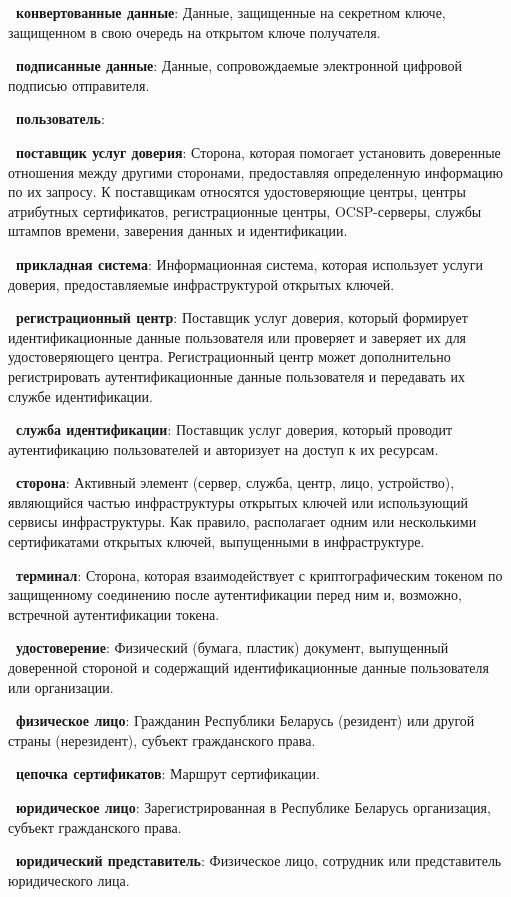 {\bf \thedefctr~конвертованные данные}:
Данные, защищенные на секретном ключе, 
защищенном в свою очередь на открытом ключе получателя. 

{\bf \thedefctr~подписанные данные}:
Данные, сопровождаемые электронной цифровой подписью отправителя. 

{\bf\thedefctr~пользователь}: 

{\bf\thedefctr~поставщик услуг доверия}:
Сторона, которая помогает установить доверенные отношения между другими 
сторонами, предоставляя определенную информацию по их запросу.
К поставщикам относятся удостоверяющие центры, центры атрибутных 
сертификатов, регистрационные центры, OCSP-серверы, 
службы штампов времени, заверения данных и идентификации.

{\bf\thedefctr~прикладная система}:
Информационная система, которая использует услуги доверия,
предоставляемые инфраструктурой открытых ключей.
%

{\bf\thedefctr~регистрационный центр}: 
Поставщик услуг доверия, который формирует идентификационные данные 
пользователя или проверяет и заверяет их для удостоверяющего центра. 
%
Регистрационный центр может дополнительно регистрировать 
аутентификационные данные пользователя и передавать их службе 
идентификации.

{\bf\thedefctr~служба идентификации}: 
Поставщик услуг доверия, который проводит аутентификацию 
пользователей и авторизует на доступ к их ресурсам.
%

{\bf\thedefctr~сторона}: 
Активный элемент (сервер, служба, центр, лицо, устройство), являющийся 
частью инфраструктуры открытых ключей или использующий сервисы инфраструктуры. 
Как правило, располагает одним или несколькими сертификатами 
открытых ключей, выпущенными в инфраструктуре.

{\bf\thedefctr~терминал}: 
Сторона, которая взаимодействует с криптографическим токеном по 
защищенному соединению после аутентификации перед ним и, возможно, 
встречной аутентификации токена.  

{\bf\thedefctr~удостоверение}: 
Физический (бумага, пластик) документ,
выпущенный доверенной стороной и содержащий идентификационные данные 
пользователя или организации. 

{\bf\thedefctr~физическое лицо}: 
Гражданин Республики Беларусь (резидент) или другой страны (нерезидент),
субъект гражданского права. 

{\bf\thedefctr~цепочка сертификатов}: 
Маршрут сертификации.

{\bf\thedefctr~юридическое лицо}:
Зарегистрированная в Республике Беларусь организация, 
субъект гражданского права.

{\bf\thedefctr~юридический представитель}: 
Физическое лицо, сотрудник или представитель юридического лица.
